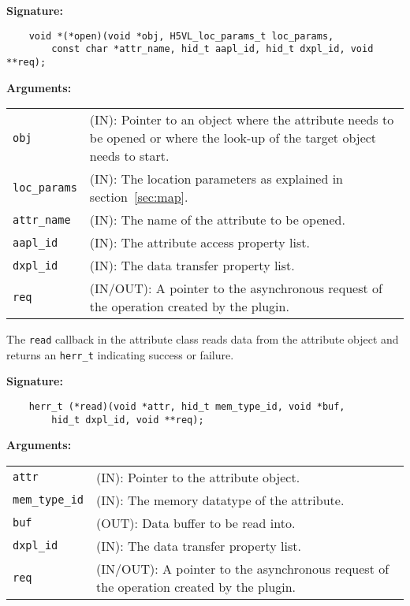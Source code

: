 \begin{mdframed}[style=bgbox]
\textbf{Signature:}
\begin{lstlisting}
    void *(*open)(void *obj, H5VL_loc_params_t loc_params, 
        const char *attr_name, hid_t aapl_id, hid_t dxpl_id, void **req);
\end{lstlisting}

\textbf{Arguments:}\\
\begin{tabular}{l p{10cm}}
  \texttt{obj} & (IN): Pointer to an object where the attribute needs to be
  opened or where the look-up of the target object needs to start.\\
  \texttt{loc\_params} & (IN): The location parameters as explained in
  section~\ref{sec:map}.\\
  \texttt{attr\_name} & (IN): The name of the attribute to be opened.\\
  \texttt{aapl\_id} & (IN): The attribute access property list.\\
  \texttt{dxpl\_id} & (IN): The data transfer property list.\\
  \texttt{req} & (IN/OUT): A pointer to the asynchronous request of the
  operation created by the plugin.\\
\end{tabular}
\end{mdframed}

The \texttt{read} callback in the attribute class reads data from
the attribute object and returns an \texttt{herr\_t} indicating success or
failure.\bigskip

\begin{mdframed}[style=bgbox]
\textbf{Signature:}
\begin{lstlisting}
    herr_t (*read)(void *attr, hid_t mem_type_id, void *buf, 
        hid_t dxpl_id, void **req);
\end{lstlisting}

\textbf{Arguments:}\\
\begin{tabular}{l p{10cm}}
  \texttt{attr} & (IN): Pointer to the attribute object.\\
  \texttt{mem\_type\_id} & (IN): The memory datatype of the attribute.\\
  \texttt{buf} & (OUT): Data buffer to be read into.\\
  \texttt{dxpl\_id} & (IN): The data transfer property list.\\
  \texttt{req} & (IN/OUT): A pointer to the asynchronous request of the
  operation created by the plugin.\\
\end{tabular}
\end{mdframed}

